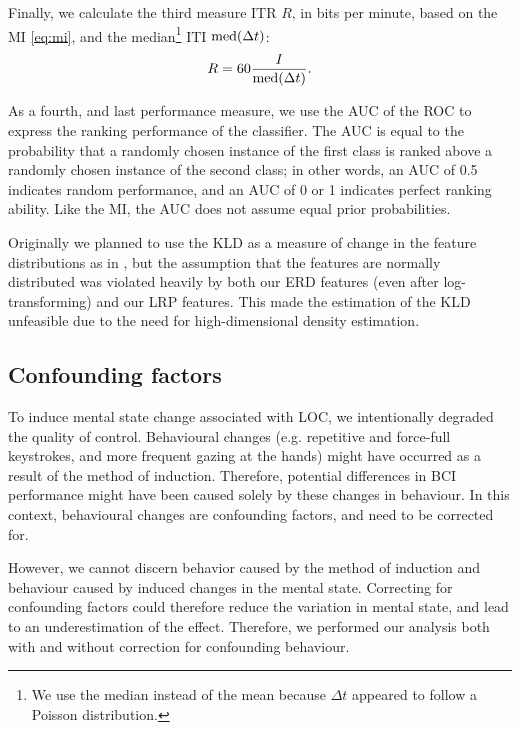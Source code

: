 Finally, we calculate the third measure \ac{ITR} $R$, in bits per minute, based on the
\ac{MI} \eqref{eq:mi}, and the median\footnote{We use the median instead
of the mean because $\Delta t$ appeared to follow a Poisson distribution.} \acl{ITI} $\operatorname{med}(\Delta t)$:
%
\begin{equation}
  R = 60 \frac{I}{\operatorname{med}(\Delta t)}.
\end{equation}

As a fourth, and last performance measure, we use the \ac{AUC} of the \ac{ROC}
\cite{fawcett2005ira} to express the ranking performance of the classifier. The
\ac{AUC} is equal to the probability that a randomly chosen instance of the
first class is ranked above a randomly chosen instance of the second class;
in other words, an \ac{AUC} of 0.5 indicates random performance, and an
\ac{AUC} of 0 or 1 indicates perfect ranking ability. Like the \ac{MI}, the
\ac{AUC} does not assume equal prior probabilities.

Originally we planned to use the \ac{KLD} as a measure of change in the feature
distributions as in \cite{shenoy2006tac}, but the assumption that the features
are normally distributed was violated heavily by both our \ac{ERD} features
(even after log-transforming) and our \ac{LRP} features. This made the
estimation of the \ac{KLD} unfeasible due to the need for high-dimensional
density estimation.


\subsection{Confounding factors}
\begin{sloppypar}
To induce mental state change associated with \ac{LOC}, we intentionally
degraded the quality of control. Behavioural changes (e.g. repetitive and
force-full keystrokes, and more frequent gazing at the hands) might have
occurred as a result of the method of induction. Therefore, potential
differences in \ac{BCI} performance might have been caused solely by these
changes in behaviour. In this context, behavioural changes are confounding
factors, and need to be corrected for. 
\end{sloppypar}

However, we cannot discern behavior caused by the method of induction and
behaviour caused by induced changes in the mental state. Correcting for
confounding factors could therefore reduce the variation in mental state, and
lead to an underestimation of the effect. Therefore, we performed our analysis
both with and without correction for confounding behaviour.

